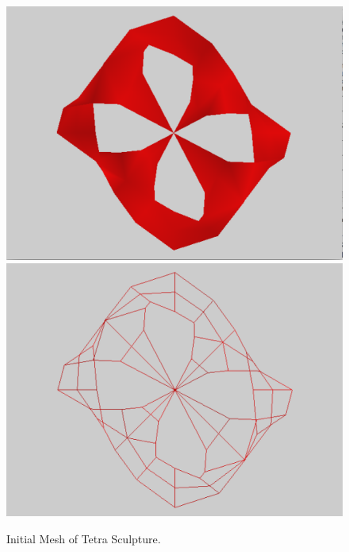 \documentclass[12pt]{article}
\begin{document}
\begin{figure}[h!]
  \centering
    \includegraphics[width=\textwidth]{Tetra0}
    \includegraphics[width=\textwidth]{Tetra0w}
  \caption{Initial Mesh of Tetra Sculpture.} \label{figure:Tetra0}
\end{figure}
\end{document}
